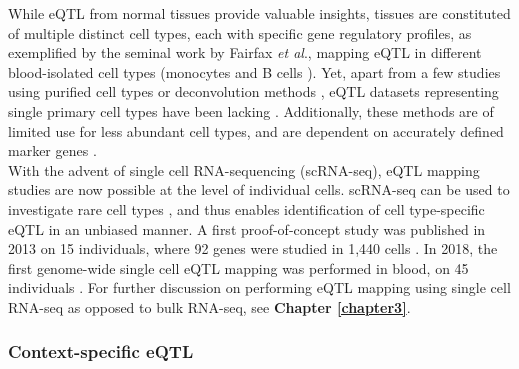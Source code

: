 While eQTL from normal tissues provide valuable insights, tissues are constituted of multiple distinct cell types, each with specific gene regulatory profiles, as exemplified by the seminal work by Fairfax \textit{et al}., mapping eQTL in different blood-isolated cell types (monocytes and B cells \cite{fairfax2012genetics}).
Yet, apart from a few studies using purified cell types \cite{fairfax2012genetics, kasela2017pathogenic, naranbhai2015genomic} or deconvolution methods \cite{westra2015cell, venet2001separation},
eQTL datasets representing single primary cell types
have been lacking \cite{zhang2018cell}.
Additionally, these methods are 
of limited use for less abundant cell types, and are dependent on accurately defined marker genes \cite{zhernakova2017identification}. \\
 
With the advent of single cell RNA-sequencing (scRNA-seq), eQTL mapping studies are now possible at the level of individual cells. 
scRNA-seq can be used to investigate rare cell types \cite{villani2017single}, and thus enables identification of cell type-specific eQTL in an unbiased manner. 
A first proof-of-concept study was published in 2013 on 15 individuals, where 92 genes were studied in 1,440 cells \cite{wills2013single}.
In 2018, the first genome-wide single cell eQTL mapping was performed in blood, on 45 individuals \cite{van2018single}.
For further discussion on performing eQTL mapping using single cell RNA-seq as opposed to bulk RNA-seq, see \textbf{Chapter 
\ref{chapter3}}.

\subsubsection{Context-specific eQTL}

